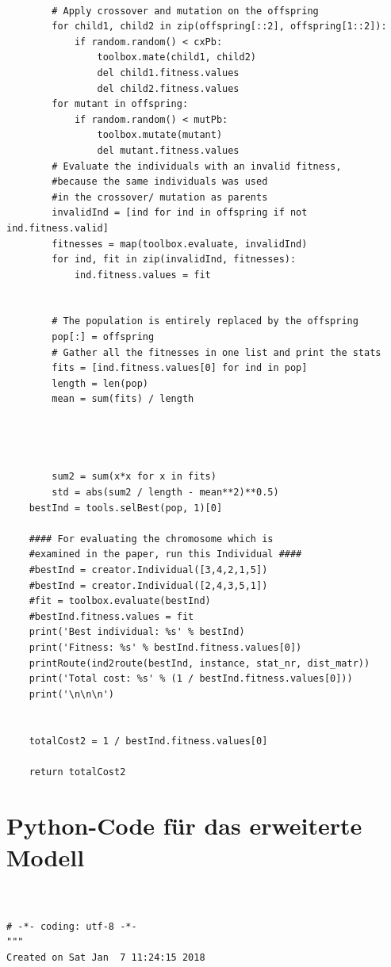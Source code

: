 \documentclass[a4paper,12pt,parskip,bibtotoc,liststotoc]{article}
\begin{document}
\begin{appendix}
\begin{lstlisting}
        
        # Apply crossover and mutation on the offspring
        for child1, child2 in zip(offspring[::2], offspring[1::2]):
            if random.random() < cxPb:
                toolbox.mate(child1, child2)
                del child1.fitness.values
                del child2.fitness.values
        for mutant in offspring:
            if random.random() < mutPb:
                toolbox.mutate(mutant)
                del mutant.fitness.values
        # Evaluate the individuals with an invalid fitness,
        #because the same individuals was used
        #in the crossover/ mutation as parents
        invalidInd = [ind for ind in offspring if not ind.fitness.valid]       
        fitnesses = map(toolbox.evaluate, invalidInd)
        for ind, fit in zip(invalidInd, fitnesses):
            ind.fitness.values = fit
   
        
        # The population is entirely replaced by the offspring
        pop[:] = offspring
        # Gather all the fitnesses in one list and print the stats
        fits = [ind.fitness.values[0] for ind in pop]
        length = len(pop)
        mean = sum(fits) / length
        
        
        
        
        sum2 = sum(x*x for x in fits)
        std = abs(sum2 / length - mean**2)**0.5)
    bestInd = tools.selBest(pop, 1)[0]
    
    #### For evaluating the chromosome which is
    #examined in the paper, run this Individual ####
    #bestInd = creator.Individual([3,4,2,1,5])
    #bestInd = creator.Individual([2,4,3,5,1])
    #fit = toolbox.evaluate(bestInd)
    #bestInd.fitness.values = fit
    print('Best individual: %s' % bestInd)
    print('Fitness: %s' % bestInd.fitness.values[0])
    printRoute(ind2route(bestInd, instance, stat_nr, dist_matr))
    print('Total cost: %s' % (1 / bestInd.fitness.values[0]))
    print('\n\n\n')


    totalCost2 = 1 / bestInd.fitness.values[0]

    return totalCost2

\end{lstlisting}

\section{Python-Code für das erweiterte Modell}

\begin{lstlisting}


# -*- coding: utf-8 -*-
"""
Created on Sat Jan  7 11:24:15 2018


\end{lstlisting}
\end{appendix}
\end{document}
